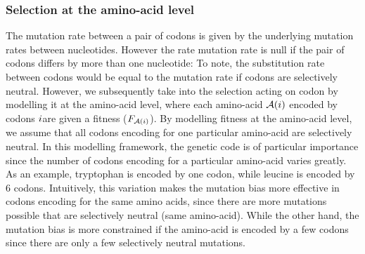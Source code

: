 \subsubsection{Selection at the amino-acid level}
\label{sec-mut-bias:aa-selection}
The mutation rate between a pair of codons is given by the underlying mutation rates between nucleotides.
However the rate mutation rate is null if the pair of codons differs by more than one nucleotide:
To note, the substitution rate between codons would be equal to the mutation rate if codons are selectively neutral.
However, we subsequently take into the selection acting on codon by modelling it at the amino-acid level, where each amino-acid $\mathcal{A}({i})$ encoded by codons ${i} $are given a fitness ($F_{\mathcal{A}({i})}$).
By modelling fitness at the amino-acid level, we assume that all codons encoding for one particular amino-acid are selectively neutral.
In this modelling framework, the genetic code is of particular importance since the number of codons encoding for a particular amino-acid varies greatly.
As an example, tryptophan is encoded by one codon, while leucine is encoded by 6 codons.
Intuitively, this variation makes the mutation bias more effective in codons encoding for the same amino acids, since there are more mutations possible that are selectively neutral (same amino-acid).
While the other hand, the mutation bias is more constrained if the amino-acid is encoded by a few codons since there are only a few selectively neutral mutations.\\

